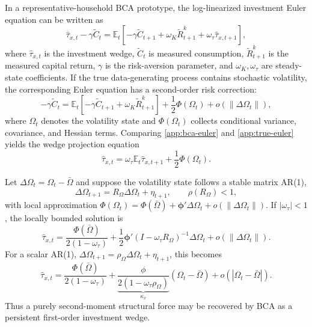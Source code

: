 \documentclass[12pt]{article}
\newcommand{\E}{\mathbb{E}}
\begin{document}
In a representative-household BCA prototype, the log-linearized investment Euler equation can
be written as
\begin{equation}
\hat{\tau}_{x,t}-\gamma \tilde C_t
=
\E_t\left[
-\gamma \tilde C_{t+1}
+\omega_K \tilde R^k_{t+1}
+\omega_\tau \hat{\tau}_{x,t+1}
\right],
\label{app:bca-euler}
\end{equation}
where $\hat{\tau}_{x,t}$ is the investment wedge, $\tilde C_t$ is measured
consumption, $\tilde R^k_{t+1}$ is the measured capital return, $\gamma$ is the risk-aversion
parameter, and $\omega_K,\omega_\tau$ are steady-state coefficients. If the true data-generating process
contains stochastic volatility, the corresponding Euler equation has a second-order risk
correction:
\begin{equation}
-\gamma \tilde C_t
=
\E_t\left[
-\gamma \tilde C_{t+1}
+\omega_K \tilde R^k_{t+1}
\right]
+\frac{1}{2}\Phi(\Omega_t)
+o(\|\Delta\Omega_t\|),
\label{app:true-euler}
\end{equation}
where $\Omega_t$ denotes the volatility state and $\Phi(\Omega_t)$ collects conditional
variance, covariance, and Hessian terms. Comparing \eqref{app:bca-euler} and
\eqref{app:true-euler} yields the wedge projection equation
\begin{equation}
\hat{\tau}_{x,t}
=
\omega_\tau \E_t \hat{\tau}_{x,t+1}
+\frac{1}{2}\Phi(\Omega_t).
\label{app:projection}
\end{equation}

Let $\Delta\Omega_t=\Omega_t-\bar{\Omega}$ and suppose the volatility state follows a stable
matrix AR(1),
\begin{equation}
\Delta\Omega_{t+1}=R_\Omega\Delta\Omega_t+\eta_{t+1},
\qquad \rho(R_\Omega)<1,
\label{app:matrix-ar}
\end{equation}
with local approximation
$\Phi(\Omega_t)=\Phi(\bar{\Omega})+\bm{\phi}'\Delta\Omega_t+
o(\|\Delta\Omega_t\|)$. If $|\omega_\tau|<1$, the locally bounded solution is
\begin{equation}
\hat{\tau}_{x,t}
=
\frac{\Phi(\bar{\Omega})}{2(1-\omega_\tau)}
+\frac{1}{2}\bm{\phi}'(I-\omega_\tau R_\Omega)^{-1}\Delta\Omega_t
+o(\|\Delta\Omega_t\|).
\label{app:closed-form}
\end{equation}
For a scalar AR(1), $\Delta\Omega_{t+1}=\rho_\Omega\Delta\Omega_t+\eta_{t+1}$, this becomes
\begin{equation}
\hat{\tau}_{x,t}
=
\frac{\Phi(\bar{\Omega})}{2(1-\omega_\tau)}
+\underbrace{\frac{\phi}{2(1-\omega_\tau\rho_\Omega)}}_{\kappa_x}
(\Omega_t-\bar{\Omega})
+o(|\Omega_t-\bar{\Omega}|).
\label{app:scalar-closed-form}
\end{equation}
Thus a purely second-moment structural force may be recovered by BCA as a persistent
first-order investment wedge.
\end{document}
